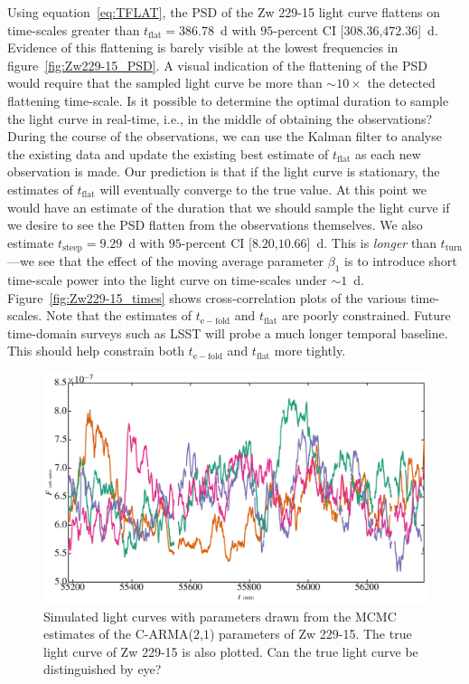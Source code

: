 \documentclass[a4paper,fleqn,usenatbib]{mnras}
\begin{document}
Using equation~\eqref{eq:TFLAT}, the PSD of the Zw 229-15 light curve flattens on time-scales greater than $t_{\mathrm{flat}} = 386.78$~d with $95$-percent CI [$308.36$,$472.36$]~d. Evidence of this flattening is barely visible at the lowest frequencies in figure~\ref{fig:Zw229-15_PSD}. A visual indication of the flattening of the PSD would require that the sampled light curve be more than $\sim 10 \times$ the detected flattening time-scale. Is it possible to determine the optimal duration to sample the light curve in real-time, i.e., in the middle of obtaining the observations? During the course of the observations, we can use the Kalman filter to analyse the existing data and update the existing best estimate of  $t_{\mathrm{flat}}$ as each new observation is made. Our prediction is that if the light curve is stationary, the estimates of $t_{\mathrm{flat}}$ will eventually converge to the true value. At this point we would have an estimate of the duration that we should sample the light curve if we desire to see the PSD flatten from the observations themselves. We also estimate $t_{\mathrm{steep}} = 9.29$~d with $95$-percent CI [$8.20$,$10.66$]~d. This is \textit{longer} than $t_{\mathrm{turn}}$---we see that the effect of the moving average parameter $\beta_{1}$ is to introduce short time-scale power into the light curve on time-scales under $\sim 1$~d. Figure~\ref{fig:Zw229-15_times} shows cross-correlation plots of the various time-scales. Note that the estimates of $t_\mathrm{e-fold}$ and $t_{\mathrm{flat}}$ are poorly constrained. Future time-domain surveys such as LSST will probe a much longer temporal baseline. This should help constrain both $t_{\mathrm{e-fold}}$ and $t_{\mathrm{flat}}$ more tightly.

\begin{figure}
	\includegraphics[width=\columnwidth]{images/Zw229-15_mockLC.jpg}
    \caption{Simulated light curves with parameters drawn from the MCMC estimates of the C-ARMA($2$,$1$) parameters of Zw 229-15. The true light curve of Zw 229-15 is also plotted. Can the true light curve be distinguished by eye?}
    \label{fig:Zw229-15_mock}
\end{figure}
\end{document}
